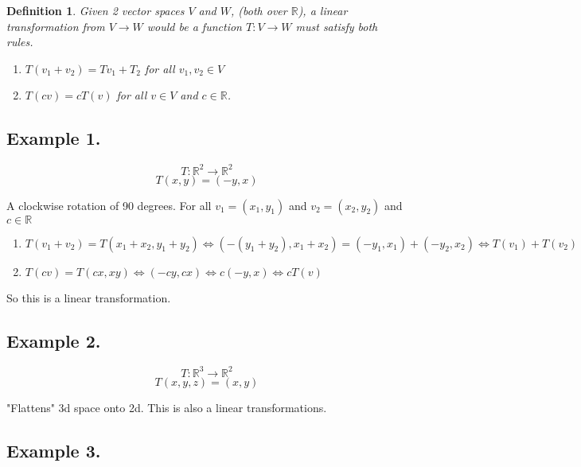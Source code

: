 \documentclass{article}
\newtheorem{definition}[theorem]{Definition}
\newtheorem{one minute paper}[theorem]{One Minute Paper}
\begin{document}
\begin{definition}
    Given 2 vector spaces $V$ and $W$, (both over $\mathbb{R}$), a linear transformation from $V \rightarrow W$ would be a function $T: V \rightarrow W$ must satisfy both rules. 
    \begin{enumerate}
        \item $T(v_1 + v_2) = Tv_1 + T_2$ for all $v_1, v_2 \in V$
        \item $T(cv) = cT(v)$ for all $v \in V$ and $c \in \mathbb{R}$. 
    \end{enumerate}
\end{definition}

\subsection*{Example 1.} 
\begin{equation}
    T: \mathbb{R}^2 \rightarrow \mathbb{R}^2
\end{equation}
\begin{equation}
    T(x,y) = (-y,x)
\end{equation}

A clockwise rotation of 90 degrees. For all $v_1 = (x_1,y_1)$ and $v_2 = (x_2,y_2)$ and $c \in \mathbb{R}$
\begin{enumerate}
    \item $T(v_1+v_2) = T(x_1+x_2, y_1+y_2) \iff (-(y_1+y_2), x_1 + x_2) = (-y_1,x_1) + (-y_2, x_2)  \iff T(v_1) + T(v_2)$
    \item $T(cv) = T(cx,xy) \iff (-cy,cx) \iff c(-y,x) \iff cT(v)$
\end{enumerate}

So this is a linear transformation. 

\subsection*{Example 2.}

\begin{equation}
    T: \mathbb{R}^3 \rightarrow \mathbb{R}^2
\end{equation}
\begin{equation}
    T(x,y,z) = (x,y)
\end{equation}

"Flattens" 3d space onto 2d. This is also a linear transformations. 

\subsection*{Example 3.}
\end{document}

